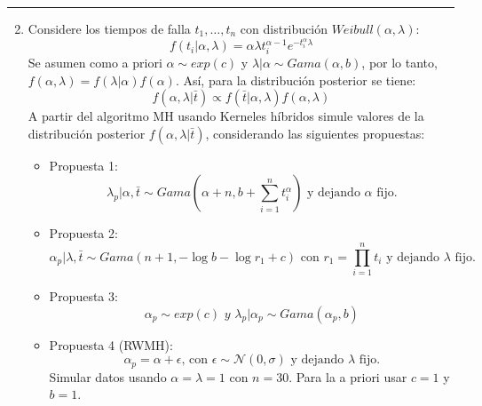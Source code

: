 \newpage
{\color{lightgray} \hrule}
\begin{enumerate} \setcounter{enumi}{1}
	\item Considere los tiempos de falla $t_1, \dots, t_n$ con distribución $Weibull(\alpha, \lambda)$:
	\begin{equation} \label{eq:7}
		f(t_i | \alpha, \lambda) = \alpha \lambda t_{i} ^{\alpha-1} e^{-t_{i}^{\alpha}\lambda}
	\end{equation}
	Se asumen como a priori $\alpha \sim exp(c)$ y $\lambda|\alpha \sim Gama(\alpha, b)$, por lo tanto, $f(\alpha, \lambda) = f(\lambda|\alpha) f(\alpha)$. Así, para la distribución posterior se tiene:
	\begin{equation} \label{eq:8}
		f(\alpha,\lambda|\bar{t}) \propto f(\bar{t}|\alpha, \lambda) f(\alpha, \lambda)
	\end{equation}
	A partir del algoritmo MH usando Kerneles híbridos simule valores de la distribución posterior $f(\alpha, \lambda | \bar{t})$, considerando las siguientes propuestas:
	\begin{itemize}
		\item Propuesta 1:
		\begin{equation} \label{eq:9}
			\lambda_p | \alpha, \bar{t} \sim Gama \left( \alpha+n, b+\sum_{i=1}^{n} t_i^{\alpha} \right) \text{ y dejando $\alpha$ fijo}.
		\end{equation}
		\item Propuesta 2:
		\begin{equation} \label{eq:10}
			\alpha_p | \lambda, \bar{t} \sim Gama \left( n+1, -\log{b} - \log{r_1} + c \right) \text{ con } r_1 = \prod_{i=1}^{n} t_i \text{ y dejando $\lambda$ fijo}.
		\end{equation}
		\item Propuesta 3:
		\begin{equation} \label{eq:11}
			\alpha_p \sim exp(c) \textit{ y } \lambda_p|\alpha_p\sim Gama(\alpha_p,b)
		\end{equation}
		\item Propuesta 4 (RWMH):
		\begin{equation} \label{eq:12}
			\alpha_p = \alpha + \epsilon \text{, con } \epsilon\sim\mathcal{N}(0,\sigma) \text{ y dejando $\lambda$ fijo}.
		\end{equation}
		Simular datos usando $\alpha=\lambda=1$ con $n= 30$. Para la a priori usar $c= 1$ y $b= 1$.
	\end{itemize}
\end{enumerate}

